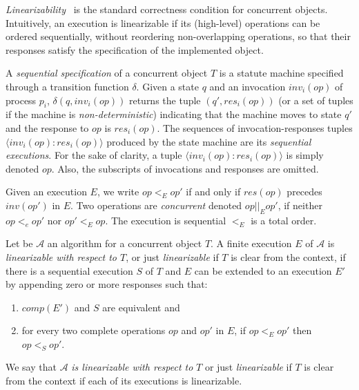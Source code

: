 \emph{Linearizability}~\cite{DBLP_journals_toplas_HerlihyW90} is the standard correctness condition for concurrent objects. Intuitively, an execution is linearizable if its (high-level) operations can be ordered sequentially, without reordering non-overlapping operations, so that their responses satisfy the specification of the implemented object.

A \emph{sequential specification} of a concurrent object \(T\) is a statute machine specified through a transition function \(\delta\). Given a state \(q\) and an invocation \(inv_i(op)\) of process \(p_i\), \(\delta(q, inv_i(op))\) returns the tuple \((q', res_i(op))\) (or a set of tuples if the machine is \emph{non-deterministic}) indicating that the machine moves to state \(q'\) and the response to \(op\) is \(res_i(op)\). The sequences of invocation-responses tuples \(\langle inv_i(op): res_i(op)\rangle\) produced by the state machine are its \emph{sequential executions}. For the sake of clarity, a tuple \(\langle inv_i(op): res_i(op)\rangle\) is simply denoted \(op\). Also, the subscripts of invocations and responses are omitted.

Given an execution \(E\), we write \(op <_E op'\) if and only if \(res(op)\) precedes \(inv(op')\) in \(E\). Two operations are \emph{concurrent} denoted \(op||_E op' \), if neither \(op <_e op'\) nor \(op' <_E op\). The execution is sequential \(<_E\) is a total order.

\begin{definition}
Let be \(\mathcal{A}\) an algorithm for a concurrent object \(T\). A finite execution \(E\) of \(\mathcal{A}\) is \emph{linearizable with respect to \(T\)}, or just \emph{linearizable} if \(T\) is clear from the context, if there is a sequential execution \(S\) of \(T\) and \(E\) can be extended to an execution \(E'\) by appending zero or more responses such that:

\begin{enumerate}
    \item \(comp(E')\) and \(S\) are equivalent and
    \item for every two complete operations \(op\) and \(op'\) in \(E\), if \(op <_E op'\) then \(op <_S op'\).
\end{enumerate}

We say that \(\mathcal{A}\) \emph{is linearizable with respect to} \(T\) or just \emph{linearizable} if \(T\) is clear from the context if each of its executions is linearizable.
\end{definition}

